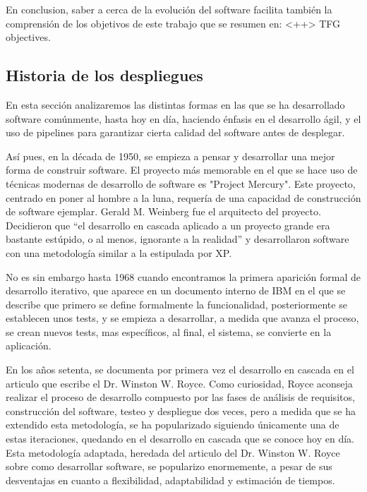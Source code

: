 \documentclass[12pt]{report} %
\begin{document}
En conclusion, saber a cerca de la evolución del software facilita también la
comprensión de los objetivos de este trabajo que se resumen en: <++> %
TFG objectives.


\subsection{Historia de los despliegues}

En esta sección analizaremos las distintas formas en las que se ha desarrollado
software comúnmente, hasta hoy en día, haciendo énfasis en el desarrollo ágil, y
el uso de \Gls{pipeline}s para garantizar cierta calidad del software antes de
desplegar.

Así pues, en la década de 1950, se empieza a pensar y desarrollar una mejor
forma de construir software.  El proyecto más memorable en el que se hace uso de
técnicas modernas de desarrollo de software es "Project Mercury".  Este
proyecto, centrado en poner al hombre a la luna, requería de una capacidad de
construcción de software ejemplar.  Gerald M. Weinberg fue el arquitecto del
proyecto.  Decidieron que ``el desarrollo en cascada aplicado a un proyecto
grande era bastante estúpido, o al menos, ignorante a la realidad'' \cite{GW-PM}
y desarrollaron software con una metodología similar a la estipulada por XP.
\cite{XP}

No es sin embargo hasta 1968 cuando encontramos la primera aparición formal de
desarrollo iterativo, que aparece en un documento interno de IBM en el que se
describe que primero se define formalmente la funcionalidad, posteriormente se
establecen unos tests, y se empieza a desarrollar, a medida que avanza el
proceso, se crean nuevos tests, mas específicos, al final, el sistema, se
convierte en la aplicación. \cite{ID-FB}

En los años setenta, se documenta por primera vez el desarrollo en cascada en el
articulo que escribe el Dr. Winston W. Royce.  Como curiosidad, Royce aconseja
realizar el proceso de desarrollo compuesto por las fases de análisis de
requisitos, construcción del software, testeo y despliegue dos veces, pero a
medida que se ha extendido esta metodología, se ha popularizado siguiendo
únicamente una de estas iteraciones, quedando en el desarrollo en cascada que se
conoce hoy en día. \cite{royce1970} Esta metodología adaptada, heredada del
articulo del Dr. Winston W. Royce sobre como desarrollar software, se popularizo
enormemente, a pesar de sus desventajas en cuanto a flexibilidad, adaptabilidad
y estimación de tiempos.
\end{document}
